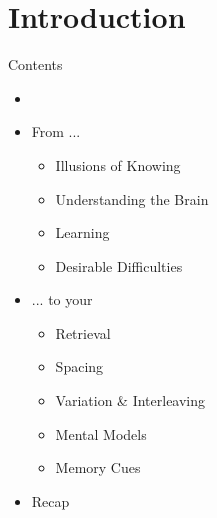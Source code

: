 \documentclass{ercisbeamer}
\begin{document}
\section{Introduction}
\begin{frame}{Contents}
    \begin{itemize}
        \item {}
        \item From ...
        \begin{itemize}
            \item Illusions of Knowing
            \item Understanding the Brain
            \item Learning
            \item Desirable Difficulties
        \end{itemize}
        \item ... to your 
        \begin{itemize}
            \item Retrieval
            \item Spacing
            \item Variation \& Interleaving
            \item Mental Models
            \item Memory Cues
        \end{itemize}
        \item Recap
    \end{itemize}
\end{frame}
\end{document}
